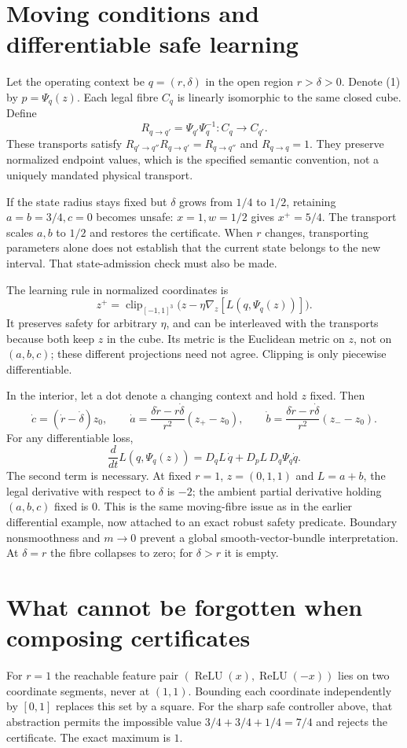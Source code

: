 \documentclass[11pt]{article}
\begin{document}
\section{Moving conditions and differentiable safe learning}
Let the operating context be $q=(r,\delta)$ in the open region $r>\delta>0$. Denote (1) by $p=\Psi_q(z)$. Each legal fibre $C_q$ is linearly isomorphic to the same closed cube. Define
\[
 R_{q\to q'}=\Psi_{q'}\Psi_q^{-1}:C_q\longrightarrow C_{q'}.
\]
These transports satisfy $R_{q'\to q''}R_{q\to q'}=R_{q\to q''}$ and $R_{q\to q}=1$. They preserve normalized endpoint values, which is the specified semantic convention, not a uniquely mandated physical transport.

If the state radius stays fixed but $\delta$ grows from $1/4$ to $1/2$, retaining $a=b=3/4,c=0$ becomes unsafe: $x=1,w=1/2$ gives $x^+=5/4$. The transport scales $a,b$ to $1/2$ and restores the certificate. When $r$ changes, transporting parameters alone does not establish that the current state belongs to the new interval. That state-admission check must also be made.

The learning rule in normalized coordinates is
\[
 z^+=\operatorname{clip}_{[-1,1]^3}\bigl(z-\eta\nabla_z[L(q,\Psi_q(z))]\bigr).
\]
It preserves safety for arbitrary $\eta$, and can be interleaved with the transports because both keep $z$ in the cube. Its metric is the Euclidean metric on $z$, not on $(a,b,c)$; these different projections need not agree. Clipping is only piecewise differentiable.

In the interior, let a dot denote a changing context and hold $z$ fixed. Then
\[
 \dot c=(\dot r-\dot\delta)z_0,\qquad
 \dot a=\frac{\delta\dot r-r\dot\delta}{r^2}(z_+-z_0),\qquad
 \dot b=\frac{\delta\dot r-r\dot\delta}{r^2}(z_--z_0).
\]
For any differentiable loss,
\[
 \frac{d}{dt}L(q,\Psi_q(z))=D_qL\,\dot q+D_pL\,D_q\Psi_q\dot q.
\]
The second term is necessary. At fixed $r=1$, $z=(0,1,1)$ and $L=a+b$, the legal derivative with respect to $\delta$ is $-2$; the ambient partial derivative holding $(a,b,c)$ fixed is $0$. This is the same moving-fibre issue as in the earlier differential example, now attached to an exact robust safety predicate. Boundary nonsmoothness and $m\to0$ prevent a global smooth-vector-bundle interpretation. At $\delta=r$ the fibre collapses to zero; for $\delta>r$ it is empty.

\section{What cannot be forgotten when composing certificates}
For $r=1$ the reachable feature pair
$(\operatorname{ReLU}(x),\operatorname{ReLU}(-x))$ lies on two coordinate segments, never at $(1,1)$. Bounding each coordinate independently by $[0,1]$ replaces this set by a square. For the sharp safe controller above, that abstraction permits the impossible value $3/4+3/4+1/4=7/4$ and rejects the certificate. The exact maximum is $1$.
\end{document}
